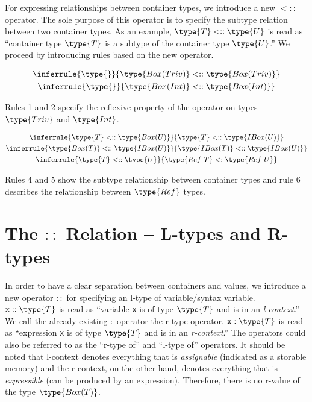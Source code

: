 \documentclass{article}
\newcommand\rtypeof{\mathrel{:}}
\newcommand\ltypeof{\mathrel{::}}
\newcommand\subtype{\mathrel{<:}}
\newcommand\subtypecont{\mathrel{<::}}
\newcommand{\syntax}{\texttt}
\begin{document}
For expressing relationships between container types, we introduce a new
$\subtypecont$ operator. The sole purpose of this operator is to specify the
subtype relation between two container types. As an example, $\type{T}
\subtypecont \type{U}$ is read as ``container type $\type{T}$ is a subtype of
the container type $\type{U}$.'' We proceed by introducing rules based on the
new operator.

\begin{gather}
  \inferrule{\type{}}{\type{Box(Triv)} \subtypecont \type{Box(Triv)}}\\
  \inferrule{\type{}}{\type{Box(Int)} \subtypecont \type{Box(Int)}}
\end{gather}

Rules 1 and 2 specify the reflexive property of the operator on types
$\type{Triv}$ and $\type{Int}$.

\begin{gather}
  \inferrule{\type{T} \subtypecont \type{Box(U)}}{\type{T} \subtypecont \type{IBox(U)}}\\
  \inferrule{\type{Box(T)} \subtypecont \type{IBox(U)}}{\type{IBox(T)} \subtypecont \type{IBox(U)}}\\
  \inferrule{\type{T} \subtypecont \type{U}}{\type{Ref\ T} \subtype \type{Ref\ U}}
\end{gather}

Rules 4 and 5 show the subtype relationship between container types and rule
6 describes the relationship between $\type{Ref}$ types.


\section*{The $\ltypeof$ Relation -- L-types and R-types}

In order to have a clear separation between containers and values, we introduce
a new operator $\ltypeof$ for specifying an l-type of variable/syntax variable.
$\syntax{x} :: \type{T}$ is read as ``variable \syntax{x} is of type $\type{T}$
and is in an \textit{l-context}.'' We call the already existing $\rtypeof$
operator the r-type operator. $\syntax{x} : \type{T}$ is read as ``expression
\syntax{x} is of type $\type{T}$ and is in an \textit{r-context}.'' The
operators could also be referred to as the ``r-type of'' and ``l-type of''
operators. It should be noted that l-context denotes everything that is
\textit{assignable} (indicated as a storable memory) and the r-context, on the
other hand, denotes everything that is \textit{expressible} (can be produced by
an expression). Therefore, there is no r-value of the type $\type{Box(T)}$.
\end{document}
